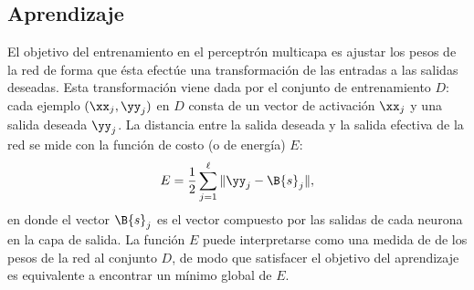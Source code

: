 %
%
\subsection{Aprendizaje}
%






El objetivo del entrenamiento en el perceptrón multicapa es ajustar
los pesos de la red de forma que ésta efectúe una transformación
de las entradas a las salidas deseadas. Esta transformación viene dada
por el conjunto de entrenamiento $D$: cada ejemplo $(\xx_j,\yy_j)$ en
$D$ consta de un vector de activación $\xx_j$ y una salida deseada
$\yy_j$.
La distancia entre la salida deseada y la salida efectiva de la red se
mide con la función de costo (o de energía) $E$:
%
\begin{align}
  E = \frac{1}{2}\sum_{j=1}^{\ell}\|\yy_j-\B{s}_j\|,
\end{align}
%
en donde el vector $\B{s}_j$ es el vector compuesto por las salidas de
cada neurona en la capa de salida. La función $E$ puede
interpretarse como una medida de  de los pesos de la red al
conjunto $D$, de modo que satisfacer el objetivo del aprendizaje es
equivalente a encontrar un mínimo global de $E$.

